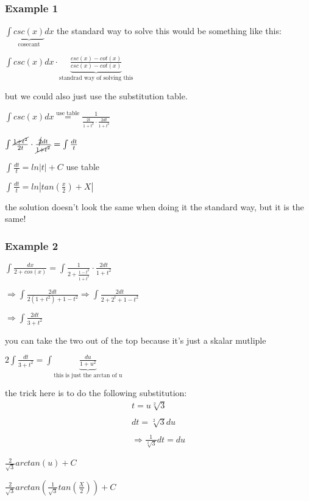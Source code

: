 \documentclass{article}
\begin{document}
\subsubsection*{Example 1}
$\int \underbrace{csc(x)}_{\text{cosecant}} dx $
the standard way to solve this would be something
like this:

$\int csc(x) dx \cdot \underbrace{\frac{csc(x)-cot(x)}{csc(x)-cot(x)}}_{\text{standrad way of solving this}}$

but we could also just use the substitution table.

$\int csc(x)dx \stackrel{\text{use table}}{=} \frac{1}{\frac{2t}{1+t^2} \cdot \frac{2dt}{1+t^2}}$

$\int \frac{\cancel{1+t^2}}{2t} \cdot \frac{\cancel{2}dt}{\cancel{1+t^2}} = \int \frac{dt}{t}$

$\int \frac{dt}{t} =ln |t| +C $ use table

$\int \frac{dt}{t} = ln |tan(\frac{x}{2})+X|$

the solution doesn't look the same when doing it the standard way, but it is the same!

\subsubsection*{Example 2}

$\int \frac{dx}{2+cos(x)}=\int \frac{1}{2+\frac{1-t^2}{1+t^2}} \cdot \frac{2dt}{1+t^2}$

$\Rightarrow \int \frac{2dt}{2(1+t^2)+1-t^2} \Rightarrow \int \frac{2dt}{2+2^t+1-t^2}$

$\Rightarrow \int \frac{2dt}{3+t^2}$

you can take the two out of the top because it's just a skalar mutliple

$2\int \frac{dt}{3+t^2} = \int \underbrace{\frac{du}{1+u^2}}_{\text{this is just the arctan of u}}$

the trick here is to do the following substitution:
\begin{align*}
    t=u\sqrt[2]{3}
    \\\\
    dt=\sqrt[2]{3}du
    \\\\
    \Rightarrow \frac{1}{\sqrt[2]{3}}dt = du
\end{align*}

$\frac{2}{\sqrt{3}}arctan(u)+C$

$\frac{2}{\sqrt{3}}arctan(\frac{1}{\sqrt{3}}tan(\frac{X}{2}))+C$
\end{document}
